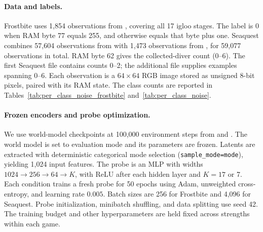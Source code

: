 \documentclass{article} %
\begin{document}
\paragraph{Data and labels.}
Frostbite uses 1,854 observations from , covering all 17 igloo stages. The label is 0 when RAM byte 77 equals 255, and otherwise equals that byte plus one. Seaquest combines 57,604 observations from  with 1,473 observations from , for 59,077 observations in total. RAM byte 62 gives the collected-diver count (0--6). The first Seaquest file contains counts 0--2; the additional file supplies examples spanning 0--6. Each observation is a $64\times64$ RGB image stored as unsigned 8-bit pixels, paired with its RAM state. The class counts are reported in Tables~\ref{tab:per_class_noise_frostbite} and~\ref{tab:per_class_noise}.

\paragraph{Frozen encoders and probe optimization.}
We use world-model checkpoints at 100,000 environment steps from  and . The world model is set to evaluation mode and its parameters are frozen. Latents are extracted with deterministic categorical mode selection (\texttt{sample\_mode=mode}), yielding 1,024 input features. The probe is an MLP with widths $1024\rightarrow256\rightarrow64\rightarrow K$, with ReLU after each hidden layer and $K=17$ or 7. Each condition trains a fresh probe for 50 epochs using Adam, unweighted cross-entropy, and learning rate $0.005$. Batch sizes are 256 for Frostbite and 4,096 for Seaquest. Probe initialization, minibatch shuffling, and data splitting use seed 42. The training budget and other hyperparameters are held fixed across strengths within each game.
\end{document}
